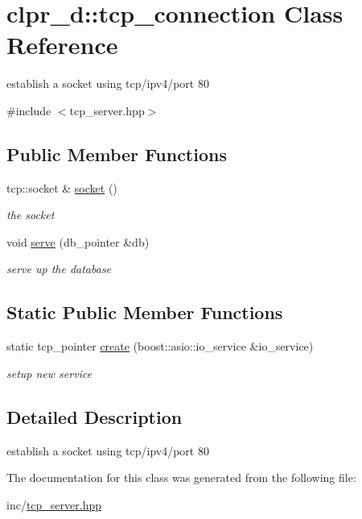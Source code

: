 \hypertarget{classclpr__d_1_1tcp__connection}{\section{clpr\-\_\-d\-:\-:tcp\-\_\-connection \-Class \-Reference}
\label{classclpr__d_1_1tcp__connection}
}


establish a socket using tcp/ipv4/port 80  




{\ttfamily \#include $<$tcp\-\_\-server.\-hpp$>$}

\subsection*{\-Public \-Member \-Functions}
\begin{DoxyCompactItemize}
\item 
\hypertarget{classclpr__d_1_1tcp__connection_a4e97ce9e6e3db874ddd78c116ff313ed}{tcp\-::socket \& \hyperlink{classclpr__d_1_1tcp__connection_a4e97ce9e6e3db874ddd78c116ff313ed}{socket} ()}\label{classclpr__d_1_1tcp__connection_a4e97ce9e6e3db874ddd78c116ff313ed}

\begin{DoxyCompactList}\small\item\em the socket \end{DoxyCompactList}\item 
\hypertarget{classclpr__d_1_1tcp__connection_a63c5e6ef1d906dbe6de3f6e9d0e711eb}{void \hyperlink{classclpr__d_1_1tcp__connection_a63c5e6ef1d906dbe6de3f6e9d0e711eb}{serve} (db\-\_\-pointer \&db)}\label{classclpr__d_1_1tcp__connection_a63c5e6ef1d906dbe6de3f6e9d0e711eb}

\begin{DoxyCompactList}\small\item\em serve up the database \end{DoxyCompactList}\end{DoxyCompactItemize}
\subsection*{\-Static \-Public \-Member \-Functions}
\begin{DoxyCompactItemize}
\item 
\hypertarget{classclpr__d_1_1tcp__connection_a7a40b9e5c749bb69424d2f924ee0bec9}{static tcp\-\_\-pointer \hyperlink{classclpr__d_1_1tcp__connection_a7a40b9e5c749bb69424d2f924ee0bec9}{create} (boost\-::asio\-::io\-\_\-service \&io\-\_\-service)}\label{classclpr__d_1_1tcp__connection_a7a40b9e5c749bb69424d2f924ee0bec9}

\begin{DoxyCompactList}\small\item\em setup new service \end{DoxyCompactList}\end{DoxyCompactItemize}


\subsection{\-Detailed \-Description}
establish a socket using tcp/ipv4/port 80 

\-The documentation for this class was generated from the following file\-:\begin{DoxyCompactItemize}
\item 
inc/\hyperlink{tcp__server_8hpp}{tcp\-\_\-server.\-hpp}\end{DoxyCompactItemize}
